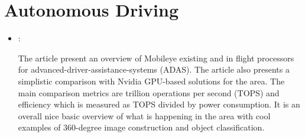 \section*{Autonomous Driving}
\begin{itemize}
    \item \cite{Delmer:Mobileye:2019}:

    The article present an overview of Mobileye existing and in flight processors for advanced-driver-assistance-systems (ADAS). The article also presents a simplistic comparison with Nvidia GPU-based solutions for the area. The main comparison metrics are trillion operations per second (TOPS) and efficiency which is measured as TOPS divided by power consumption. It is an overall nice basic overview of what is happening in the area with cool examples of 360-degree image construction and object classification.
\end{itemize}

